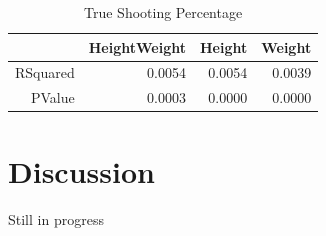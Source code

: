 \documentclass[12pt]{article}
\begin{document}
\begin{table}[ht]
\caption{True Shooting Percentage}
\label{tab:ts}
\centering
\begin{tabular}{rrrr}
  \hline
 & HeightWeight & Height & Weight \\ 
  \hline
RSquared & 0.0054 & 0.0054 & 0.0039 \\ 
  PValue & 0.0003 & 0.0000 & 0.0000 \\ 
   \hline
\end{tabular}
\end{table}



\section{Discussion}
\label{sec:disc}

Still in progress



\end{document}
